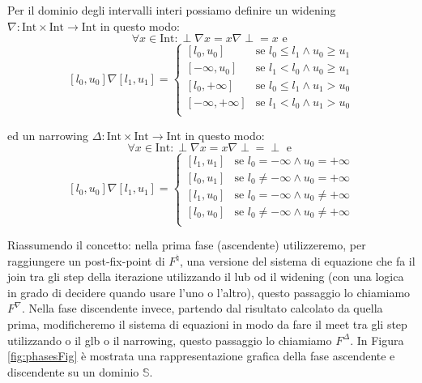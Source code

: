 \begin{example}
Per il dominio degli intervalli interi possiamo definire un widening \(\nabla:\textrm{Int}\times\textrm{Int}\rightarrow\textrm{Int}\) in questo modo: 
\[\forall x\in \textrm{Int}: \perp\nabla x = x\nabla\perp = x \textrm{ e } \]
\[
[l_0, u_0]\nabla[l_1, u_1] = 
\begin{cases}
    [l_0, u_0] & \textrm{se } l_0\leq l_1 \wedge u_0 \geq u_1 \\
    [-\infty, u_0] & \textrm{se } l_1 < l_0 \wedge u_0 \geq u_1 \\
    [l_0, +\infty] & \textrm{se } l_0\leq l_1 \wedge u_1 > u_0 \\
    [-\infty, +\infty] & \textrm{se } l_1 < l_0 \wedge u_1 > u_0 \\
\end{cases}
\]

ed un narrowing \(\Delta:\textrm{Int}\times\textrm{Int}\rightarrow\textrm{Int}\) in questo modo: 
\[\forall x\in \textrm{Int}: \perp\nabla x = x\nabla\perp = \perp \textrm{ e } \]
\[
[l_0, u_0]\nabla[l_1, u_1] = 
\begin{cases}
    [l_1, u_1] & \textrm{se } l_0 = -\infty \wedge u_0 = +\infty \\
    [l_0, u_1] & \textrm{se } l_0 \neq -\infty \wedge u_0 = +\infty \\
    [l_1, u_0] & \textrm{se } l_0 = -\infty \wedge u_0 \neq +\infty \\
    [l_0, u_0] & \textrm{se } l_0 \neq -\infty \wedge u_0 \neq +\infty \\
\end{cases}
\]
\end{example}

Riassumendo il concetto: nella prima fase (ascendente) utilizzeremo, per raggiungere un post-fix-point di \(F^{\natural}\), una versione del sistema di equazione che fa il join tra gli step della iterazione utilizzando il lub od il widening (con una logica in grado di decidere quando usare l'uno o l'altro), questo passaggio lo chiamiamo \(F^{\nabla}\). Nella fase discendente invece, partendo dal risultato calcolato da quella prima, modificheremo il sistema di equazioni in modo da fare il meet tra gli step utilizzando o il glb o il narrowing, questo passaggio lo chiamiamo \(F^{\Delta}\). 
In Figura \ref{fig:phasesFig} è mostrata una rappresentazione grafica della fase ascendente e discendente su un dominio \(\mathbb{S}\).

